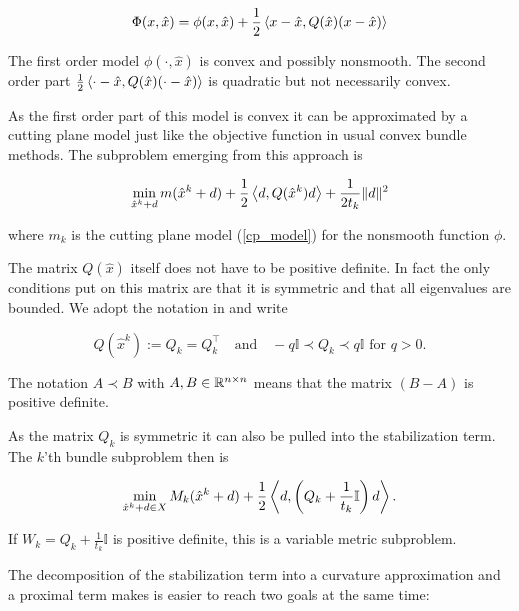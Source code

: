 \begin{equation}
	\Phi(x,\hat{x}) = \phi(x,\hat{x})+\frac{1}{2}\left\langle x-\hat{x},Q(\hat{x})(x-\hat{x})\right\rangle
\end{equation}

The first order model \(\phi(\cdot,\hat{x})\) is convex and possibly nonsmooth. The second order part \(\frac{1}{2}\left\langle \cdot-\hat{x},Q(\hat{x})(\cdot-\hat{x})\right\rangle\) is quadratic but not necessarily convex.

As the first order part of this model is convex it can be approximated by a cutting plane model just like the objective function in usual convex bundle methods. The subproblem emerging from this approach is

\begin{equation*}
	\min_{\hat{x}^k+d} m(\hat{x}^k+d)+\frac{1}{2}\left\langle d,Q(\hat{x}^k)d \right\rangle + \frac{1}{2t_k}\|d\|^2
\label{sub_prob_Noll}
\end{equation*} 

where \(m_k\) is the cutting plane model (\ref{cp_model}) for the nonsmooth function \(\phi\).

The matrix \(Q(\hat{x})\) itself does not have to be positive definite. In fact the only conditions put on this matrix are that it is symmetric and that all eigenvalues are bounded.
We adopt the notation in \cite{Noll2013} and write

\begin{equation*}
		Q(\hat{x}^k):=Q_k = Q_k^{\top} \quad \text{and} \quad -q\mathbb{I} \prec Q_k \prec q\mathbb{I} \text{ for } q > 0.
\end{equation*}

The notation \( A \prec B\) with \(A, B \in \mathbb{R}^{n\times n}\) means that the matrix \((B-A)\) is positive definite.

As the matrix \(Q_k\) is symmetric it can also be pulled into the stabilization term. The \(k\)'th bundle subproblem then is

\begin{equation}
	\min_{\hat{x}^k+d \in X} M_k(\hat{x}^k+d) + \frac{1}{2}\left\langle d,\left(Q_k+\frac{1}{t_k}\mathbb{I} \right) d \right\rangle.
	\label{Q_subprob}
\end{equation}

If \(W_k = Q_k+\frac{1}{t_k}\mathbb{I}\) is positive definite, this is a variable metric subproblem.

The decomposition of the stabilization term into a curvature approximation and a proximal term makes is easier to reach two goals at the same time:

